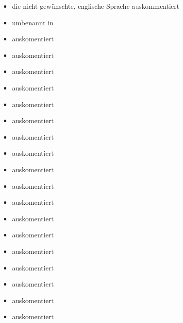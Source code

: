 	\begin{itemize}
	\item die nicht gewünschte, englische Sprache auskommentiert 
	\item {} umbenannt in  
	
	
	\item {} auskomentiert
	\item {} auskomentiert
	\item {} auskomentiert
	\item {} auskomentiert
	\item {} auskomentiert
	\item {} auskomentiert
	\item {} auskomentiert
    \item {} auskomentiert
    \item {} auskomentiert
    \item {} auskomentiert
    \item {} auskomentiert
    \item {} auskomentiert
    \item {} auskomentiert
    \item {} auskomentiert
    \item {} auskomentiert
    \item {} auskomentiert
    \item {} auskomentiert
    \item {} auskomentiert
    
    

\end{itemize}
